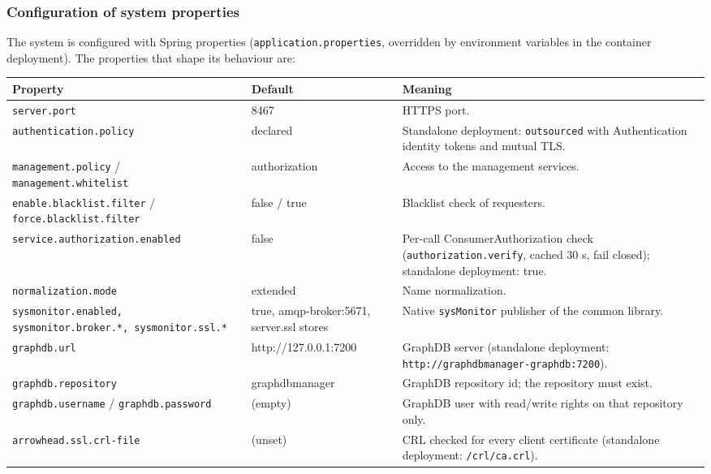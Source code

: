 \documentclass[a4paper]{arrowhead}
\begin{document}
\subsubsection{Configuration of system properties}

The system is configured with Spring properties (\texttt{application.properties}, overridden by environment variables in the container deployment). The properties that shape its behaviour are:

\noindent\begin{longtable}{| p{5.4cm} | p{3.4cm} | p{6.4cm} |} \hline
\rowcolor{gray!33} Property & Default & Meaning \\ \hline \endhead
\texttt{server.\allowbreak{}port} & 8467 & HTTPS port. \\ \hline
\texttt{authentication.\allowbreak{}policy} & declared & Standalone deployment: \texttt{outsourced} with Authentication identity tokens and mutual TLS. \\ \hline
\texttt{management.\allowbreak{}policy} / \texttt{management.\allowbreak{}whitelist} & authorization & Access to the management services. \\ \hline
\texttt{enable.\allowbreak{}blacklist.\allowbreak{}filter} / \texttt{force.\allowbreak{}blacklist.\allowbreak{}filter} & false / true & Blacklist check of requesters. \\ \hline
\texttt{service.\allowbreak{}authorization.\allowbreak{}enabled} & false & Per-call Consumer\allowbreak{}Authorization check (\texttt{authorization.\allowbreak{}verify}, cached 30 s, fail closed); standalone deployment: true. \\ \hline
\texttt{normalization.\allowbreak{}mode} & extended & Name normalization. \\ \hline
\texttt{sysmonitor.\allowbreak{}enabled,\allowbreak{} sysmonitor.\allowbreak{}broker.\allowbreak{}*,\allowbreak{} sysmonitor.\allowbreak{}ssl.\allowbreak{}*} & true, amqp-broker:5671, server.ssl stores & Native \texttt{sysMonitor} publisher of the common library. \\ \hline
\texttt{graphdb.\allowbreak{}url} & http://127.0.0.1:7200 & GraphDB server (standalone deployment: \texttt{http://\allowbreak{}graphdbmanager-\allowbreak{}graphdb:7200}). \\ \hline
\texttt{graphdb.\allowbreak{}repository} & graphdbmanager & GraphDB repository id; the repository must exist. \\ \hline
\texttt{graphdb.\allowbreak{}username} / \texttt{graphdb.\allowbreak{}password} & (empty) & GraphDB user with read/write rights on that repository only. \\ \hline
\texttt{arrowhead.\allowbreak{}ssl.\allowbreak{}crl-\allowbreak{}file} & (unset) & CRL checked for every client certificate (standalone deployment: \texttt{/\allowbreak{}crl/\allowbreak{}ca.\allowbreak{}crl}). \\ \hline
\end{longtable}
\end{document}
